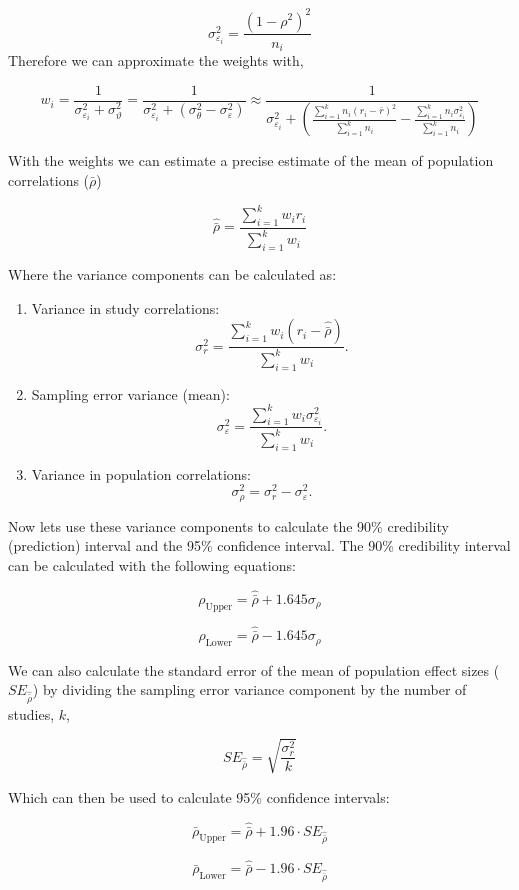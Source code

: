 \documentclass[
  letterpaper,
  DIV=11,
  numbers=noendperiod]{scrreprt}
\providecommand{\tightlist}{%
  \setlength{\itemsep}{0pt}\setlength{\parskip}{0pt}}\usepackage{longtable,booktabs,array}
\begin{document}
\[
\sigma^2_{\varepsilon_i} = \frac{\left(1-\rho^2\right)^2}{n_i}
\] Therefore we can approximate the weights with,

\[
w_i = \frac{1}{\sigma^2_{\varepsilon_i}+\sigma_\vartheta^2} = \frac{1}{\sigma^2_{\varepsilon_i}+(\sigma^2_{\theta}-\sigma^2_{\varepsilon})} \approx \frac{1}{\sigma^2_{\varepsilon_i}+\left(\frac{\sum^k_{i=1}n_i(r_i - \bar{r})^2}{\sum^k_{i=1}n_i}-\frac{\sum^k_{i=1}n_i\sigma^2_{\varepsilon_i}}{\sum^k_{i=1}n_i}\right)}
\]

With the weights we can estimate a precise estimate of the mean of
population correlations (\(\bar{\rho}\))

\[
\hat{\bar{\rho}} = \frac{\sum^k_{i=1}w_ir_i}{\sum^k_{i=1}w_i}
\]

Where the variance components can be calculated as:

\begin{enumerate}
\def\labelenumi{\arabic{enumi})}
\tightlist
\item
  Variance in study correlations: \[
  \sigma^2_{r}=\frac{\sum^k_{i=1}w_i(r_i - \hat{\bar{\rho}})}{\sum^k_{i=1}w_i}.
  \]
\item
  Sampling error variance (mean): \[
  \sigma^2_{\varepsilon} = \frac{\sum^k_{i=1}w_i\sigma^2_{\varepsilon_i}}{\sum^k_{i=1}w_i}.
  \]
\item
  Variance in population correlations: \[
  \sigma^2_\rho = \sigma^2_r - \sigma^2_{\varepsilon}.
  \]
\end{enumerate}

Now lets use these variance components to calculate the 90\% credibility
(prediction) interval and the 95\% confidence interval. The 90\%
credibility interval can be calculated with the following equations:

\[
\rho_\text{Upper} = \hat{\bar{\rho}} + 1.645\sigma_\rho
\]

\[
\rho_\text{Lower} = \hat{\bar{\rho}} - 1.645\sigma_\rho
\]

We can also calculate the standard error of the mean of population
effect sizes (\(SE_{\hat{\bar{\rho}}}\)) by dividing the sampling error
variance component by the number of studies, \(k\),

\[
SE_\hat{\bar{\rho}} = \sqrt{\frac{\sigma^2_r}{k}}
\]

Which can then be used to calculate 95\% confidence intervals:

\[
\bar{\rho}_\text{Upper} = \hat{\bar{\rho}} + 1.96\cdot SE_\hat{\bar{\rho}}
\]

\[
\bar{\rho}_\text{Lower} = \hat{\bar{\rho}} - 1.96\cdot SE_\hat{\bar{\rho}}
\]
\end{document}
